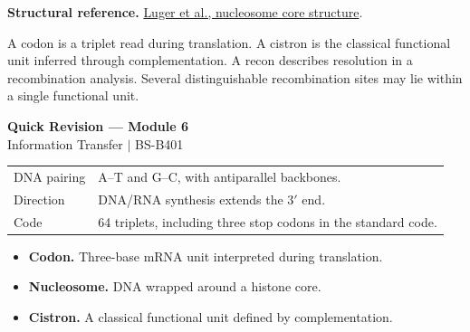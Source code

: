 \documentclass[12pt,a4paper]{article}
\renewcommand{\arraystretch}{1.45}
\begin{document}
\textbf{Structural reference.} \href{https://www.nature.com/articles/38444}{Luger et al., nucleosome core structure}.
\begin{tcolorbox}[masonbox, title={Keep the three meanings distinct}]
A codon is a triplet read during translation. A cistron is the classical functional unit inferred through complementation. A recon describes resolution in a recombination analysis. Several distinguishable recombination sites may lie within a single functional unit.
\end{tcolorbox}

\newpage
\begin{center}
  {\large\bfseries\color{myred} Quick Revision --- Module 6}\\[3pt]
  {\small\color{mydark} Information Transfer $|$ BS-B401}
\end{center}
\noindent{\color{myred}\rule{\linewidth}{1.2pt}}\par\vspace{4pt}

\begin{tcolorbox}[formulabox, title={Key Concepts at a Glance}]
\renewcommand{\arraystretch}{1.35}
\noindent\begin{tabularx}{\linewidth}{B{4.5cm}Y}
DNA pairing & A--T and G--C, with antiparallel backbones. \\[3pt]
Direction & DNA/RNA synthesis extends the $3'$ end. \\[3pt]
Code & 64 triplets, including three stop codons in the standard code. \\[3pt]
\end{tabularx}\par
\end{tcolorbox}

\begin{tcolorbox}[defbox, title={One-Line Definitions}]
\begin{itemize}[leftmargin=*, itemsep=3pt, topsep=4pt]
  \item \textbf{Codon.} Three-base mRNA unit interpreted during translation.
  \item \textbf{Nucleosome.} DNA wrapped around a histone core.
  \item \textbf{Cistron.} A classical functional unit defined by complementation.
\end{itemize}
\end{tcolorbox}
\end{document}
